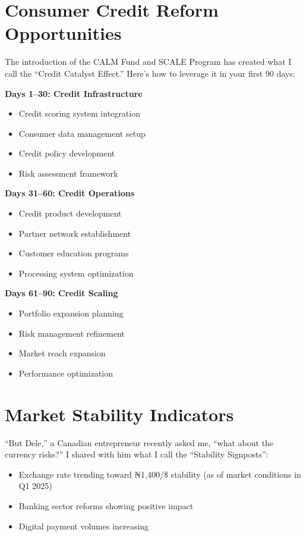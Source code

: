 \section{Consumer Credit Reform Opportunities}\label{sec:credit-reforms}

The introduction of the CALM Fund and SCALE Program has created what I call the ``Credit Catalyst Effect.'' Here's how to leverage it in your first 90 days:

\textbf{Days 1--30: Credit Infrastructure}
\begin{itemize}
    \item Credit scoring system integration
    \item Consumer data management setup
    \item Credit policy development
    \item Risk assessment framework
\end{itemize}

\textbf{Days 31--60: Credit Operations}
\begin{itemize}
    \item Credit product development
    \item Partner network establishment
    \item Customer education programs
    \item Processing system optimization
\end{itemize}

\textbf{Days 61--90: Credit Scaling}
\begin{itemize}
    \item Portfolio expansion planning
    \item Risk management refinement
    \item Market reach expansion
    \item Performance optimization
\end{itemize}

\section{Market Stability Indicators}\label{sec:market-stability}

``But Dele,'' a Canadian entrepreneur recently asked me, ``what about the currency risks?'' I shared with him what I call the ``Stability Signposts'':

\begin{itemize}
    \item Exchange rate trending toward ₦1,400/\$ stability (as of market conditions in Q1 2025)
    \item Banking sector reforms showing positive impact
    \item Digital payment volumes increasing
\end{itemize}

